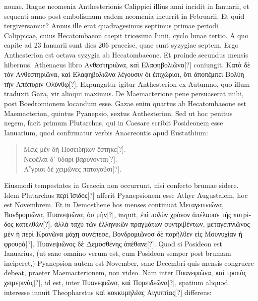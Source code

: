 nonae.
Itague neomenia Anthesterionis Calippici illius anni incidit in
 Ianuarii, et sequenti anno post embolismum eadem
 neomenia incurrit
in  Februarii.
Et quid tergiversamur?
Annus ille erat quadragesimus
septimus primae periodi Calippicae, cuius Hecatombaeon caepit
tricesima Iunii, cyclo lunae tertio.
A quo capite ad 23 Ianuarii sunt dies
206 praecise, quae sunt syzygiae septem.
Ergo Anthesterion est octava
syzygia ab Hecatombaeone.
Et proinde secundus mensis hibernus.
Athenaeus
libro  \textgreek{Ανθεστηριῶνα, καὶ Ελαφηβολιῶνα[?]} coniungit.
\textgreek{Κατὰ δὲ τὸν Ανθεστηριῶνα, καὶ Ελαφηβολιῶνα λέγουσιν
 ὁι ἐπιχώριοι, ὅτι ἀποπέμπει Βολύη τὴν
Απόπυριν Ολύνθῳ[?]}.
Expungatur igitur Anthesterion ex Autumno, quo
illum traduxit Gaza, vir alioqui maximus.
De Maemacterione pene
persuaserat mihi, post Boedromionem locandum esse.
Gazae enim
quartus ab Hecatombaeone est Maemacterion, quintus Pyanepsio, sextus
Anthesterion.
Sed ut hoc penitus negem, facit primum Plutarchus,
qui in Caesare scribit Posideonem esse Ianuarium, quod confirmatur
verbis Anacreontis apud Eustathium:
\begin{verse}
  \textgreek{Μεὶς μὲν δὴ Ποσειδηΐων ἕστηκε[?]}.\\
  \textgreek{Νεφέλαι δ᾽ ὕδαρι βαρύνονται[?]}.\\
  \textgreek{Α῎γριοι δὲ χειμῶνες παταγοῦσι[?]}.
\end{verse}
Eiusmodi tempestates in Graecia non occurrunt, nisi confecto brumae
sidere.
Idem Plutarchus \textgreek{περὶ ἴσιδος[?]}
 afferit Pyanepsionem esse Athyr
Augustalem, hoc est Novembrem.
Et in Demosthene hos menses
continuat \textgreek{Μεταγειτνιῶνα, Βονδρομιῶνα, Πυανεψιῶνα, ὀυ μὴν[?]},
 inquit, \textgreek{ἐπὶ πολὺν
χρόνον ἀπέλαυσε τὴς πατρίδος κατελθών[?]}.
\textgreek{ἀλλὰ ταχὺ τῶν ἑλληνικῶν πραγμάτων
συντριβέντων, μεταγειτνιῶνος μὲν ἡ περὶ Κρανῶνα μάχη συνέπεσε, Βονδρομιῶνοσ
δὲ παρῆλθεν εἰς Μουνυχίαν ἡ φρουρά[?]}.
\textgreek{Πυανεψιῶνος δὲ Δεμοσθένης ἀπέθανε[?]}.
Quod si Posideon est Ianuarius, (ut sane omnino verum est, cum Posideon
semper post brumam inciperet,) Pyanepsion autem est November,
sane Decembri quis mensis congruere debeat, praeter Maemacterionem,
non video.
Nam inter \textgreek{Πυανεφιῶνα, καὶ τροπὰς χειμερινὰς[?]}, id est, inter
\textgreek{Πυανεφιῶνα, καὶ Πορειδεῶνα[?]},
 spatium aliquod interesse innuit Theopharstus
\textgreek{καὶ κοκκυμηλέας Αιγυπτίας[?]} differens:

